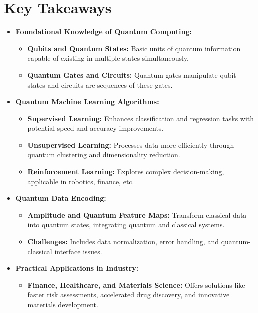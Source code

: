 \documentclass{book}
\begin{document}
\section*{Key Takeaways}

\begin{itemize}
    \item \textbf{Foundational Knowledge of Quantum Computing:}
    \begin{itemize}
        \item \textbf{Qubits and Quantum States:} Basic units of quantum information capable of existing in multiple states simultaneously.
        \item \textbf{Quantum Gates and Circuits:} Quantum gates manipulate qubit states and circuits are sequences of these gates.
    \end{itemize}
    
    \item \textbf{Quantum Machine Learning Algorithms:}
    \begin{itemize}
        \item \textbf{Supervised Learning:} Enhances classification and regression tasks with potential speed and accuracy improvements.
        \item \textbf{Unsupervised Learning:} Processes data more efficiently through quantum clustering and dimensionality reduction.
        \item \textbf{Reinforcement Learning:} Explores complex decision-making, applicable in robotics, finance, etc.
    \end{itemize}
    
    \item \textbf{Quantum Data Encoding:}
    \begin{itemize}
        \item \textbf{Amplitude and Quantum Feature Maps:} Transform classical data into quantum states, integrating quantum and classical systems.
        \item \textbf{Challenges:} Includes data normalization, error handling, and quantum-classical interface issues.
    \end{itemize}
    
    \item \textbf{Practical Applications in Industry:}
    \begin{itemize}
        \item \textbf{Finance, Healthcare, and Materials Science:} Offers solutions like faster risk assessments, accelerated drug discovery, and innovative materials development.
    \end{itemize}
    

\end{itemize}
\end{document}
